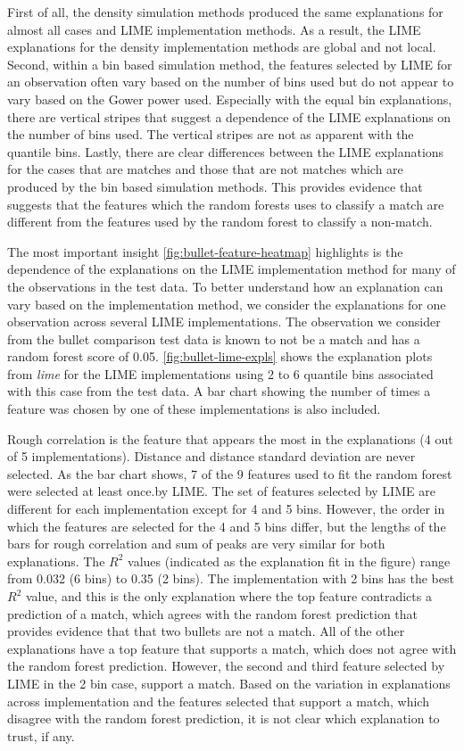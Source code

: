 \documentclass[AMS,STIX2COL]{WileyNJD-v2}\usepackage[]{graphicx}\usepackage[]{color}
\begin{document}
{First of all, the density simulation methods produced the same explanations for almost all cases and LIME implementation methods. As a result, the LIME explanations for the density implementation methods are global and not local. Second, within a bin based simulation method, the features selected by LIME for an observation often vary based on the number of bins used but do not appear to vary based on the Gower power used. Especially with the equal bin explanations, there are vertical stripes that suggest a dependence of the LIME explanations on the number of bins used. The vertical stripes are not as apparent with the quantile bins. Lastly, there are clear differences between the LIME explanations for the cases that are matches and those that are not matches which are produced by the bin based simulation methods. This provides evidence that suggests that the features which the random forests uses to classify a match are different from the features used by the random forest to classify a non-match.

The most important insight \autoref{fig:bullet-feature-heatmap} highlights is the dependence of the explanations on the LIME implementation method for many of the observations in the test data. To better understand how an explanation can vary based on the implementation method, we consider the explanations for one observation across several LIME implementations. The observation we consider from the bullet comparison test data is known to not be a match and has a random forest score of 0.05. \autoref{fig:bullet-lime-expls} shows the explanation plots from \emph{lime} for the LIME implementations using 2 to 6 quantile bins associated with this case from the test data. A bar chart showing the number of times a feature was chosen by one of these implementations is also included.

Rough correlation is the feature that appears the most in the explanations (4 out of 5 implementations). Distance and distance standard deviation are never selected. As the bar chart shows, 7 of the 9 features used to fit the random forest were selected at least once.by LIME. The set of features selected by LIME are different for each implementation except for 4 and 5 bins. However, the order in which the features are selected for the 4 and 5 bins differ, but the lengths of the bars for rough correlation and sum of peaks are very similar for both explanations. The $R^2$ values (indicated as the explanation fit in the figure) range from 0.032 (6 bins) to 0.35 (2 bins). The implementation with 2 bins has the best $R^2$ value, and this is the only explanation where the top feature contradicts a prediction of a match, which agrees with the random forest prediction that provides evidence that that two bullets are not a match. All of the other explanations have a top feature that supports a match, which does not agree with the random forest prediction. However, the second and third feature selected by LIME in the 2 bin case, support a match. Based on the variation in explanations across implementation and the features selected that support a match, which disagree with the random forest prediction, it is not clear which explanation to trust, if any.

}
\end{document}
